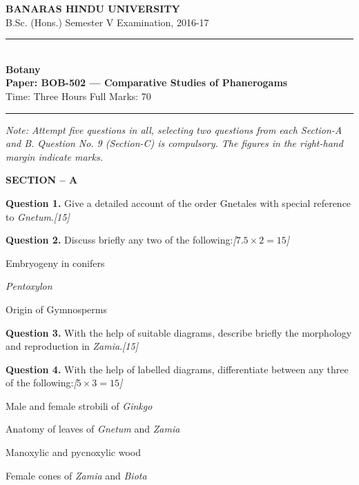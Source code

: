\documentclass[11pt,a4paper]{article}
\newcommand{\pts}[1]{\hfill   \textit{[#1]}}
\begin{document}
\begin{center}
  {\large\bfseries BANARAS HINDU UNIVERSITY}\\[2pt]
  {\normalsize B.Sc. (Hons.) Semester V Examination, 2016-17}\\[6pt]
  \rule{0.8\linewidth}{0.5pt}\\[6pt]
  {\large\bfseries Botany}\\[4pt]
  {\large\bfseries Paper: BOB-502 --- Comparative Studies of Phanerogams}\\[4pt]
  {\normalsize Time: Three Hours \hfill Full Marks: 70}
\end{center}

\rule{\linewidth}{0.4pt}

\smallskip



\noindent   \textit{Note: Attempt five questions in all, selecting two questions from each Section-A and B. Question No. 9 (Section-C) is compulsory. The figures in the right-hand margin indicate marks.}

\bigskip

\begin{center}
   \textbf{SECTION -- A}
\end{center}

\medskip


\noindent   \textbf{Question 1.} Give a detailed account of the order Gnetales with special reference to   \textit{Gnetum}.\pts{15}

\medskip


\noindent   \textbf{Question 2.} Discuss briefly any two of the following:\pts{$7.5  \times 2 = 15$}

\begin{parts}
  \item Embryogeny in conifers
  \item   \textit{Pentoxylon}
  \item Origin of Gymnosperms
\end{parts}

\medskip


\noindent   \textbf{Question 3.} With the help of suitable diagrams, describe briefly the morphology and reproduction in   \textit{Zamia}.\pts{15}

\medskip


\noindent   \textbf{Question 4.} With the help of labelled diagrams, differentiate between any three of the following:\pts{$5  \times 3 = 15$}

\begin{parts}
  \item Male and female strobili of   \textit{Ginkgo}
  \item Anatomy of leaves of   \textit{Gnetum} and   \textit{Zamia}
  \item Manoxylic and pycnoxylic wood
  \item Female cones of   \textit{Zamia} and   \textit{Biota}
\end{parts}
\end{document}
